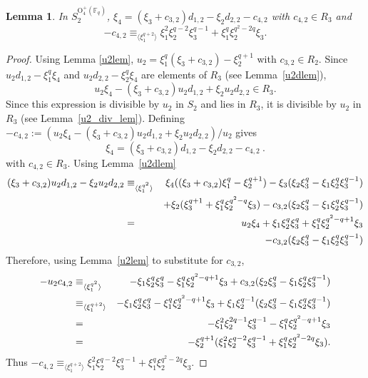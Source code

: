 \documentclass{amsart}
\newcommand{\field}{\mathbb{F}}
\newcommand{\orthp}[2]{{{\text{O}^{+}_{{#1}}(\field_{#2})}}}
\newtheorem{lem}[subsection]{Lemma}
\begin{document}
\begin{lem} \label{dg02lem} In $S_2^{\orthp{4}{q}}$, $\xi_4=(\xi_3+c_{3,2})d_{1,2}-\xi_2d_{2,2}-c_{4,2}$ with $c_{4,2}\in R_3$ and
 $$-c_{4,2}\equiv_{\langle \xi_1^{q+2}\rangle} \xi_1^2\xi_2^{q-2}\xi_3^{q-1}+\xi_1^q\xi_2^{q^2-2q}\xi_3.$$
 \end{lem}
 \begin{proof} Using Lemma \ref{u2lem}, $u_2=\xi_1^q(\xi_3+c_{3,2})-\xi_2^{q+1}$ with $c_{3,2}\in R_2$.
 Since $u_2d_{1,2}-\xi_1^q\xi_4$ and $u_2d_{2,2}-\xi_2^q\xi_4$ are elements of $R_3$
 (see Lemma~\ref{u2dlem}),
 $$u_2\xi_4-(\xi_3+c_{3,2})u_2d_{1,2}+\xi_2u_2d_{2,2}\in R_3.$$
 Since this expression is divisible by $u_2$ in $S_2$ and lies in $R_3$, it is divisible by $u_2$ in $R_3$ (see Lemma~\ref{u2_div_lem}). 
 Defining $-c_{4,2}:= (u_2\xi_4-(\xi_3+c_{3,2})u_2d_{1,2}+\xi_2u_2d_{2,2})/u_2$ gives 
 $$\xi_4=(\xi_3+c_{3,2})d_{1,2}-\xi_2d_{2,2}-c_{4,2}\ .$$ with $c_{4,2}\in R_3$.
 Using Lemma~\ref{u2dlem}
 \begin{eqnarray*}
 (\xi_3+c_{3,2})u_2d_{1,2}-\xi_2u_2d_{2,2}&\equiv_{\langle \xi_1^{q^2}\rangle}&\xi_4((\xi_3+c_{3,2})\xi_1^q-\xi_2^{q+1})-\xi_3(\xi_2\xi_3^q-\xi_1\xi_2^q\xi_3^{q-1})\cr
 &&+\xi_2(\xi_3^{q+1}+\xi_1^q\xi_2^{q^2-q}\xi_3)-c_{3,2}(\xi_2\xi_3^q-\xi_1\xi_2^q\xi_3^{q-1})\cr
 &=& u_2\xi_4+\xi_1\xi_2^q\xi_3^q+\xi_1^q\xi_2^{q^2-q+1}\xi_3\cr
 &&-c_{3,2}(\xi_2\xi_3^q-\xi_1\xi_2^q\xi_3^{q-1})
 \end{eqnarray*}
 Therefore, using Lemma~\ref{u2lem} to substitute for $c_{3,2}$,
  \begin{eqnarray*}
-u_2c_{4,2}&\equiv_{\langle \xi_1^{q^2}\rangle}&-\xi_1\xi_2^q\xi_3^q-\xi_1^q\xi_2^{q^2-q+1}\xi_3+c_{3,2}(\xi_2\xi_3^q-\xi_1\xi_2^q\xi_3^{q-1})\cr
&\equiv_{\langle \xi_1^{q+2}\rangle}&-\xi_1\xi_2^q\xi_3^q-\xi_1^q\xi_2^{q^2-q+1}\xi_3+\xi_1\xi_2^{q-1}(\xi_2\xi_3^q-\xi_1\xi_2^q\xi_3^{q-1})\cr
&=&-\xi_1^2\xi_2^{2q-1}\xi_3^{q-1}-\xi_1^q\xi_2^{q^2-q+1}\xi_3\cr
&=&-\xi_2^{q+1}(\xi_1^2\xi_2^{q-2}\xi_3^{q-1}+\xi_1^q\xi_2^{q^2-2q}\xi_3).
\end{eqnarray*}
 Thus $-c_{4,2}\equiv_{\langle \xi_1^{q+2}\rangle} \xi_1^2\xi_2^{q-2}\xi_3^{q-1}+\xi_1^q\xi_2^{q^2-2q}\xi_3.$
 \end{proof}
 
\end{document}
